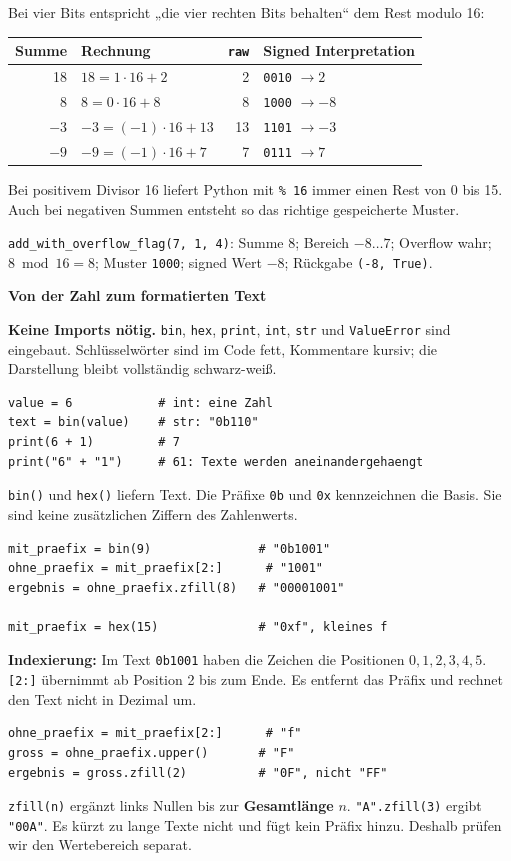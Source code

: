 \documentclass[10pt,a4paper]{article}
\newcommand{\titlepagepart}[2]{\vspace*{-4mm}{\sffamily\small #1}\par{\sffamily\LARGE\bfseries #2}\par\vspace{2mm}}
\newcommand{\block}[1]{\par\vspace{2mm}{\sffamily\large\bfseries #1}\par}
\newcommand{\code}[1]{\texttt{#1}}
\begin{document}
\block{Warum Modulo (\texttt{\%})?}
Bei vier Bits entspricht „die vier rechten Bits behalten“ dem Rest modulo 16:
\begin{center}
\begin{tabular}{rlrl}\toprule
Summe&Rechnung&\code{raw}&Signed Interpretation\\\midrule
18&$18=1\cdot16+2$&2&\code{0010} $\rightarrow 2$\\
8&$8=0\cdot16+8$&8&\code{1000} $\rightarrow -8$\\
$-3$&$-3=(-1)\cdot16+13$&13&\code{1101} $\rightarrow -3$\\
$-9$&$-9=(-1)\cdot16+7$&7&\code{0111} $\rightarrow 7$\\\bottomrule
\end{tabular}
\end{center}
Bei positivem Divisor 16 liefert Python mit \code{\% 16} immer einen Rest von
0 bis 15. Auch bei negativen Summen entsteht so das richtige gespeicherte Muster.

\block{Ein vollständiger Ablauf}
\code{add\_with\_overflow\_flag(7, 1, 4)}:
Summe $8$; Bereich $-8\ldots7$; Overflow wahr; $8\bmod16=8$;
Muster \code{1000}; signed Wert $-8$; Rückgabe \code{(-8, True)}.

\newpage
\titlepagepart{04 / PYTHON-WERKZEUGE}{Von der Zahl zum formatierten Text}
\textbf{Keine Imports nötig.} \code{bin}, \code{hex}, \code{print}, \code{int},
\code{str} und \code{ValueError} sind eingebaut. Schlüsselwörter sind im Code fett,
Kommentare kursiv; die Darstellung bleibt vollständig schwarz-weiß.

\block{Zahl und Text unterscheiden}
\begin{lstlisting}
value = 6            # int: eine Zahl
text = bin(value)    # str: "0b110"
print(6 + 1)         # 7
print("6" + "1")     # 61: Texte werden aneinandergehaengt
\end{lstlisting}
\code{bin()} und \code{hex()} liefern Text. Die Präfixe \code{0b} und \code{0x}
kennzeichnen die Basis. Sie sind keine zusätzlichen Ziffern des Zahlenwerts.

\block{Die Umwandlung in einzelnen Schritten}
\begin{lstlisting}
mit_praefix = bin(9)               # "0b1001"
ohne_praefix = mit_praefix[2:]      # "1001"
ergebnis = ohne_praefix.zfill(8)   # "00001001"

mit_praefix = hex(15)              # "0xf", kleines f
\end{lstlisting}
\textbf{Indexierung:} Im Text \code{0b1001} haben die Zeichen die Positionen
$0,1,2,3,4,5$. \code{[2:]} übernimmt ab Position 2 bis zum Ende.
Es entfernt das Präfix und rechnet den Text nicht in Dezimal um.
\begin{lstlisting}
ohne_praefix = mit_praefix[2:]      # "f"
gross = ohne_praefix.upper()       # "F"
ergebnis = gross.zfill(2)          # "0F", nicht "FF"
\end{lstlisting}
\code{zfill(n)} ergänzt links Nullen bis zur \textbf{Gesamtlänge} $n$.
\code{"A".zfill(3)} ergibt \code{"00A"}. Es kürzt zu lange Texte nicht und fügt
kein Präfix hinzu. Deshalb prüfen wir den Wertebereich separat.
\end{document}
